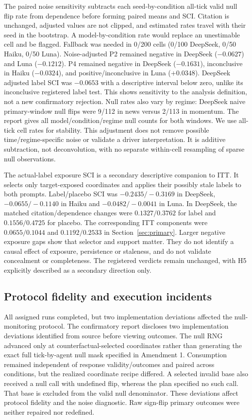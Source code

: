 \documentclass[a4paper]{article}
\begin{document}
The paired noise sensitivity subtracts each seed-by-condition all-tick valid null flip rate from dependence before forming paired means and SCI. Citation is unchanged, adjusted values are not clipped, and estimated rates travel with their seed in the bootstrap. A model-by-condition rate would replace an unestimable cell and be flagged. Fallback was needed in 0/200 cells (0/100 DeepSeek, 0/50 Haiku, 0/50 Luna). Noise-adjusted P2 remained negative in DeepSeek ($-0.0627$) and Luna ($-0.1212$). P4 remained negative in DeepSeek ($-0.1631$), inconclusive in Haiku ($-0.0324$), and positive/inconclusive in Luna ($+0.0348$). DeepSeek adjusted label SCI was $-0.0653$ with a descriptive interval below zero, unlike its inconclusive registered label test. This shows sensitivity to the analysis definition, not a new confirmatory rejection. Null rates also vary by regime: DeepSeek naive primary-window null flips were 9/112 in news versus 2/113 in momentum. The report gives all model/condition/regime null counts for both windows. We use all-tick cell rates for stability. This adjustment does not remove possible time/regime-specific noise or validate a driver interpretation. It is additive subtraction, not deconvolution, with no separate within-cell resampling of sparse null observations.

The actual-label exposure SCI is a secondary descriptive companion to ITT. It selects only target-exposed coordinates and applies their possibly stale labels to both prompts. Label/placebo SCI was $-0.2435/-0.3169$ in DeepSeek, $-0.0655/-0.1140$ in Haiku and $-0.0482/-0.0041$ in Luna. In DeepSeek, the matched citation/dependence changes were $0.1327/0.3762$ for label and $0.1556/0.4725$ for placebo. The corresponding ITT components were $0.0655/0.1044$ and $0.1192/0.2533$ in Section~\ref{sec:primary}. Larger negative exposure gaps show that selector and support matter. They do not identify a causal effect of exposure, persistence or staleness, and do not validate concealment or completeness. The registered verdicts remain unchanged, with H5 explicitly described as a secondary direction only.



\subsection{Protocol fidelity and execution incidents}\label{sec:protocol}
All assigned runs completed, but two implementation deviations affected the null-monitoring protocol. The confirmatory report discloses two implementation deviations identified from source before viewing outcomes. The null RNG advanced only at counterfactual-selected coordinates rather than generating the exact full tick-by-agent null mask specified in Amendment 1. Consumption remained independent of response validity/outcomes and paired across conditions, but the realized coordinate recipe differed. A selected invalid base also received a null call with undefined flip, whereas the plan specified no such call. That base is excluded from the valid null denominator. These deviations affect protocol fidelity and the noise diagnostic. Raw sign-flip primary outcomes were neither repaired nor redefined.
\end{document}
